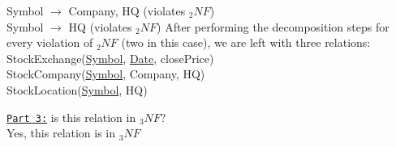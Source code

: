 \documentclass[letterpaper, 11pt]{article}
\newcommand{\1}{\mathds{1}}	%
\theoremstyle{definition}
\begin{document}
\noindent Symbol $\rightarrow$ Company, HQ (violates $_2NF$) \\
\noindent Symbol $\rightarrow$ HQ (violates $_2NF$)
\bigbreak \noindent
After performing the decomposition steps for every violation of $_2NF$ (two in this case), we are left with three relations: \vspace{2mm} \\
StockExchange(\underline{Symbol}, \underline{Date}, closePrice) \\
StockCompany(\underline{Symbol}, Company, HQ) \\
StockLocation(\underline{Symbol}, HQ)

\bigbreak \noindent
\underline{\texttt{Part 3:}} is this relation in $_3NF$? \\
Yes, this relation is in $_3NF$
\end{document}
